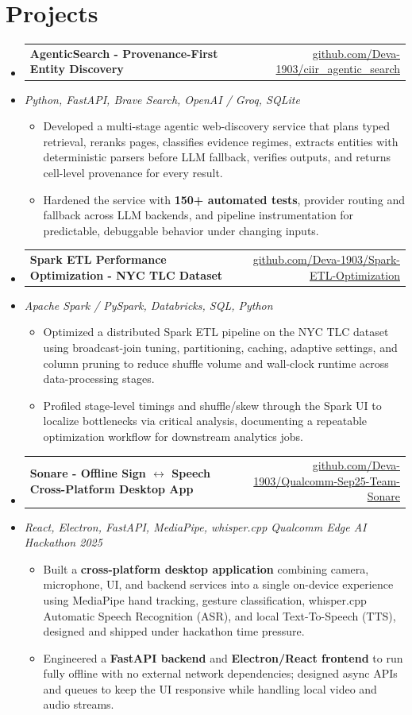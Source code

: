 \documentclass[letterpaper,10pt]{article}
\makeatletter
\newcommand{\resumeItem}[1]{
  \item\small{#1\vspace{-1pt}}
}
\newcommand{\resumeProjectHeading}[2]{
    \item
    \begin{tabular*}{0.985\textwidth}[t]{l@{\extracolsep{\fill}}r}
      \small\textbf{#1} & \small #2 \\
    \end{tabular*}\vspace{-5pt}
}
\newcommand{\resumeProjectSubheading}[1]{
  \vspace{-2pt}\item[] {\small\textcolor{ResumeSlate}{\emph{#1}}}\vspace{-3pt}
}
\newcommand{\resumeSubHeadingListStart}{\begin{itemize}[leftmargin=0.0in, label={}, itemsep=2pt, topsep=2pt]}
\newcommand{\resumeSubHeadingListEnd}{\end{itemize}}
\newcommand{\resumeItemListStart}{\begin{itemize}[leftmargin=0.18in, itemsep=2pt, topsep=1pt]}
\newcommand{\resumeItemListEnd}{\end{itemize}\vspace{-4pt}}
\makeatother
\begin{document}
\section{Projects}
\resumeSubHeadingListStart
  \resumeProjectHeading
    {AgenticSearch - Provenance-First Entity Discovery}
    {\href{https://github.com/Deva-1903/ciir_agentic_search}{github.com/Deva-1903/ciir\_agentic\_search}}
  \resumeProjectSubheading{Python, FastAPI, Brave Search, OpenAI / Groq, SQLite}
    \resumeItemListStart
      \resumeItem{Developed a multi-stage agentic web-discovery service that plans typed retrieval, reranks pages, classifies evidence regimes, extracts entities with deterministic parsers before LLM fallback, verifies outputs, and returns cell-level provenance for every result.}
      \resumeItem{Hardened the service with \textbf{150+ automated tests}, provider routing and fallback across LLM backends, and pipeline instrumentation for predictable, debuggable behavior under changing inputs.}
    \resumeItemListEnd
  \resumeProjectHeading
    {Spark ETL Performance Optimization - NYC TLC Dataset}
    {\href{https://github.com/Deva-1903/Spark-ETL-Optimization}{github.com/Deva-1903/Spark-ETL-Optimization}}
  \resumeProjectSubheading{Apache Spark / PySpark, Databricks, SQL, Python}
    \resumeItemListStart
      \resumeItem{Optimized a distributed Spark ETL pipeline on the NYC TLC dataset using broadcast-join tuning, partitioning, caching, adaptive settings, and column pruning to reduce shuffle volume and wall-clock runtime across data-processing stages.}
      \resumeItem{Profiled stage-level timings and shuffle/skew through the Spark UI to localize bottlenecks via critical analysis, documenting a repeatable optimization workflow for downstream analytics jobs.}
    \resumeItemListEnd
  \resumeProjectHeading
    {Sonare - Offline Sign \(\leftrightarrow\) Speech Cross-Platform Desktop App}
    {\href{https://github.com/Deva-1903/Qualcomm-Sep25-Team-Sonare}{github.com/Deva-1903/Qualcomm-Sep25-Team-Sonare}}
  \resumeProjectSubheading{React, Electron, FastAPI, MediaPipe, whisper.cpp \enspace\textbar\enspace Qualcomm Edge AI Hackathon 2025}
    \resumeItemListStart
      \resumeItem{Built a \textbf{cross-platform desktop application} combining camera, microphone, UI, and backend services into a single on-device experience using MediaPipe hand tracking, gesture classification, whisper.cpp Automatic Speech Recognition (ASR), and local Text-To-Speech (TTS), designed and shipped under hackathon time pressure.}
      \resumeItem{Engineered a \textbf{FastAPI backend} and \textbf{Electron/React frontend} to run fully offline with no external network dependencies; designed async APIs and queues to keep the UI responsive while handling local video and audio streams.}
    \resumeItemListEnd
\resumeSubHeadingListEnd
\vspace{-4pt}
\end{document}
